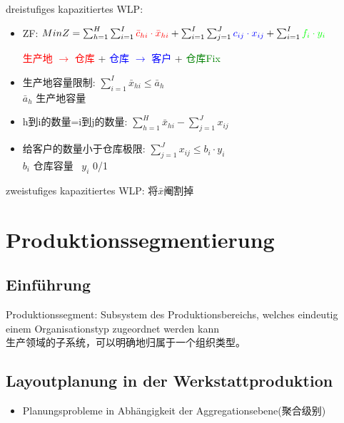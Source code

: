 \documentclass[12pt, letterpaper]{article}
\begin{document}
\begin{CJK*}{UTF8}{gbsn}
\begin{itemize}
\begin{flushleft}
dreistufiges kapazitiertes WLP:
\end{flushleft}

 \begin{itemize}
 \item  ZF: $Min Z =   \sum_{h=1}^{H} \sum_{i=1}^{I} \textcolor{red}{ \bar{c}_{hi} \cdot \bar{x}_{hi}} +
  \sum_{i=1}^{I} \sum_{j=1}^{J} \textcolor{blue}{c_{ij} \cdot x_{ij}} + 
  \sum_{i=1}^{I} \textcolor{green}{ f_i \cdot y_i}$

 
\begin{center}
\textcolor{red}{生产地 $\rightarrow$ 仓库} + \textcolor{blue}{仓库 $\rightarrow$ 客户} +  \textcolor{green}{仓库Fix}
\end{center}

\item 生产地容量限制: $\sum_{i=1}^{I}\bar{x}_{hi}\leq \bar{a}_h$\\
$\bar{a}_h$ 生产地容量

\item h到i的数量=i到j的数量: $\sum_{h=1}^{H}\bar{x}_{hi} - 
\sum_{j=1}^{J} x_{ij}$

\item 给客户的数量小于仓库极限: $\sum_{j=1}^{J}x_{ij} \leq b_i \cdot y_i$\\
$b_i$ 仓库容量 \ $y_i$ 0/1

\end{itemize}

\begin{flushleft}
zweistufiges kapazitiertes WLP: 将$\bar{x}$阉割掉
\end{flushleft}

\end{itemize}





\newpage
\section{Produktionssegmentierung}
\subsection{Einführung}
Produktionssegment: Subsystem des Produktionsbereichs, welches eindeutig einem Organisationstyp zugeordnet
werden kann\\[1mm]
生产领域的子系统，可以明确地归属于一个组织类型。


\subsection{Layoutplanung in der Werkstattproduktion}
\begin{itemize}
\item Planungsprobleme in Abhängigkeit der Aggregationsebene(聚合级别)


\end{itemize}
\end{CJK*}
\end{document}
